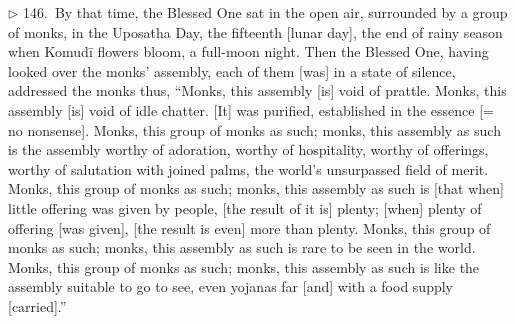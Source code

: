 
\addtocounter{sennum}{-5}
$\triangleright$  146.\ By that time, the Blessed One sat in the open air, surrounded by a group of monks, in the Uposatha Day, the fifteenth [lunar day], the end of rainy season when Komud\=i flowers bloom, a full-moon night.  Then the Blessed One, having looked over the monks' assembly, each of them [was] in a state of silence, addressed the monks thus, ``Monks, this assembly [is] void of prattle. Monks, this assembly [is] void of idle chatter. [It] was purified, established in the essence [= no nonsense]. Monks, this group of monks as such; monks, this assembly as such is the assembly worthy of adoration, worthy of hospitality, worthy of offerings, worthy of salutation with joined palms, the world's unsurpassed field of merit.  Monks, this group of monks as such; monks, this assembly as such is [that when] little offering was given by people, [the result of it is] plenty; [when] plenty of offering [was given], [the result is even] more than plenty.  Monks, this group of monks as such; monks, this assembly as such is rare to be seen in the world.  Monks, this group of monks as such; monks, this assembly as such is like the assembly suitable to go to see, even yojanas far [and] with a food supply [carried].''\\

